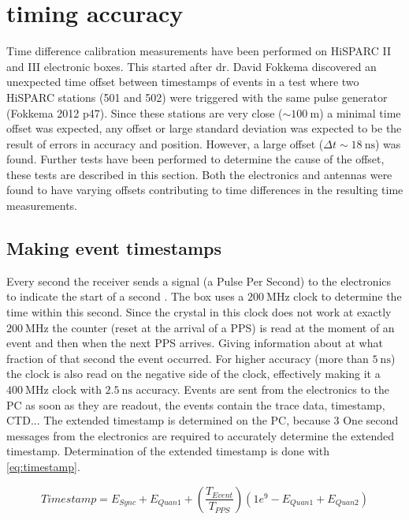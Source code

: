 \section{\gps timing accuracy}
\label{sec:gps_accuracy}

Time difference calibration measurements have been performed on HiSPARC II and III electronic boxes. This started after dr. David Fokkema discovered an unexpected time offset between timestamps of events in a test where two HiSPARC stations (501 and 502) were triggered with the same pulse generator (Fokkema 2012 p47). Since these stations are very close ($\sim\SI{100}{\meter}$) a minimal time offset was expected, any offset or large standard deviation was expected to be the result of errors in \gps accuracy and position. However, a large offset ($\Delta t \sim\SI{18}{\ns}$) was found. Further tests have been performed to determine the cause of the offset, these tests are described in this section. Both the \hisparc electronics and \gps antennas were found to have varying offsets contributing to time differences in the resulting time measurements.


\subsection{Making event timestamps}
\label{sub:gps_timestamps}

Every second the \gps receiver sends a signal (a Pulse Per Second) to the \hisparc electronics to indicate the start of a second \cite{messages}. The \hisparc box uses a $\SI{200}{\mega\hertz}$ clock to determine the time within this second. Since the crystal in this clock does not work at exactly $\SI{200}{\mega\hertz}$ the counter (reset at the arrival of a PPS) is read at the moment of an event and then when the next PPS arrives. Giving information about at what fraction of that second the event occurred. For higher accuracy (more than $\SI{5}{\ns}$) the clock is also read on the negative side of the clock, effectively making it a $\SI{400}{\mega\hertz}$ clock with $\SI{2.5}{\ns}$ accuracy. Events are sent from the \hisparc electronics to the PC as soon as they are readout, the events contain the trace data, timestamp, CTD... The extended timestamp is determined on the PC, because 3 One second messages from the electronics are required to accurately determine the extended timestamp. Determination of the extended timestamp is done with \cref{eq:timestamp}.

\begin{equation}
\label{eq:timestamp}
    Timestamp = E_{Sync} + E_{Quan1} + \left(\frac{T_{Event}}{T_{PPS}}\right)
                 \left(1e^9 - E_{Quan1} + E_{Quan2}\right)
\end{equation}

